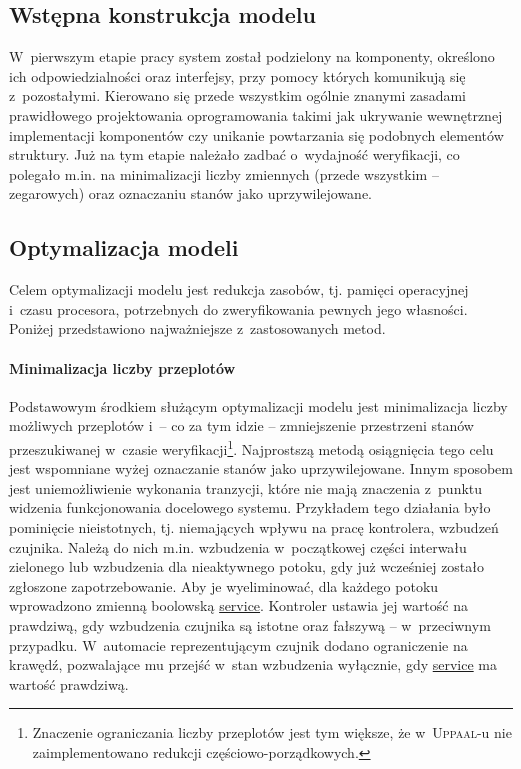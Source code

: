 \documentclass{pracamgr}
\newcommand{\upp}{\textsc{Uppaal}}
\theoremstyle{plain}
\begin{document}
\subsection{Wstępna konstrukcja modelu}

W~pierwszym etapie pracy system został podzielony na komponenty,
określono ich odpowiedzialności oraz interfejsy, przy pomocy których
komunikują się z~pozostałymi. Kierowano się przede wszystkim ogólnie
znanymi zasadami prawidłowego projektowania oprogramowania takimi jak
ukrywanie wewnętrznej implementacji komponentów czy unikanie
powtarzania się podobnych elementów struktury. Już na tym etapie
należało zadbać o~wydajność weryfikacji, co polegało m.in. na
minimalizacji liczby zmiennych (przede wszystkim -- zegarowych) oraz
oznaczaniu stanów jako uprzywilejowane.

\subsection{Optymalizacja modeli}
\label{s:models:opt}

Celem optymalizacji modelu jest redukcja zasobów, tj. pamięci
operacyjnej i~czasu procesora, potrzebnych do zweryfikowania pewnych
jego własności. Poniżej przedstawiono najważniejsze z~zastosowanych metod.

\paragraph{Minimalizacja liczby przeplotów} Podstawowym środkiem
służącym optymalizacji modelu jest minimalizacja liczby możliwych
przeplotów i~-- co za tym idzie -- zmniejszenie przestrzeni stanów
przeszukiwanej w~czasie weryfikacji\footnote{Znaczenie ograniczania
  liczby przeplotów jest tym większe, że w~\upp-u nie zaimplementowano
  redukcji częściowo-porządkowych.}. Najprostszą metodą osiągnięcia
tego celu jest wspomniane wyżej oznaczanie stanów jako uprzywilejowane.
Innym sposobem jest uniemożliwienie wykonania tranzycji, które nie
mają znaczenia z~punktu widzenia funkcjonowania docelowego
systemu. Przykładem tego działania było pominięcie nieistotnych,
tj. niemających wpływu na pracę kontrolera, wzbudzeń czujnika. Należą
do nich m.in. wzbudzenia w~początkowej części interwału zielonego lub
wzbudzenia dla nieaktywnego potoku, gdy już wcześniej zostało
zgłoszone zapotrzebowanie. Aby je wyeliminować, dla każdego potoku
wprowadzono zmienną boolowską \url{service}. Kontroler ustawia
jej wartość na prawdziwą, gdy wzbudzenia czujnika są istotne oraz
fałszywą -- w~przeciwnym przypadku. W~automacie reprezentującym
czujnik dodano ograniczenie na krawędź, pozwalające mu przejść w~stan
wzbudzenia wyłącznie, gdy \url{service} ma wartość prawdziwą.
\end{document}
